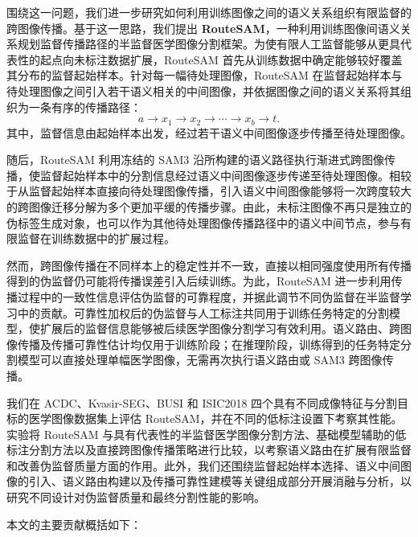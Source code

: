 \documentclass[UTF8,a4paper,10pt,twocolumn]{ctexart}
\begin{document}
围绕这一问题，我们进一步研究如何利用训练图像之间的语义关系组织有限监督的跨图像传播。基于这一思路，我们提出 \textbf{RouteSAM}，一种利用训练图像间语义关系规划监督传播路径的半监督医学图像分割框架。为使有限人工监督能够从更具代表性的起点向未标注数据扩展，RouteSAM 首先从训练数据中确定能够较好覆盖其分布的监督起始样本。针对每一幅待处理图像，RouteSAM 在监督起始样本与待处理图像之间引入若干语义相关的中间图像，并依据图像之间的语义关系将其组织为一条有序的传播路径：
\begin{equation}
a \rightarrow x_1 \rightarrow x_2 \rightarrow \cdots \rightarrow x_b \rightarrow t.
\end{equation}
其中，监督信息由起始样本出发，经过若干语义中间图像逐步传播至待处理图像。



随后，RouteSAM 利用冻结的 SAM3 沿所构建的语义路径执行渐进式跨图像传播，使监督起始样本中的分割信息经过语义中间图像逐步传递至待处理图像。相较于从监督起始样本直接向待处理图像传播，引入语义中间图像能够将一次跨度较大的跨图像迁移分解为多个更加平缓的传播步骤。由此，未标注图像不再只是独立的伪标签生成对象，也可以作为其他待处理图像传播路径中的语义中间节点，参与有限监督在训练数据中的扩展过程。

然而，跨图像传播在不同样本上的稳定性并不一致，直接以相同强度使用所有传播得到的伪监督仍可能将传播误差引入后续训练。为此，RouteSAM 进一步利用传播过程中的一致性信息评估伪监督的可靠程度，并据此调节不同伪监督在半监督学习中的贡献。可靠性加权后的伪监督与人工标注共同用于训练任务特定的分割模型，使扩展后的监督信息能够被后续医学图像分割学习有效利用。语义路由、跨图像传播及传播可靠性估计均仅用于训练阶段；在推理阶段，训练得到的任务特定分割模型可以直接处理单幅医学图像，无需再次执行语义路由或 SAM3 跨图像传播。

我们在 ACDC、Kvasir-SEG、BUSI 和 ISIC2018 四个具有不同成像特征与分割目标的医学图像数据集上评估 RouteSAM，并在不同的低标注设置下考察其性能。实验将 RouteSAM 与具有代表性的半监督医学图像分割方法、基础模型辅助的低标注分割方法以及直接跨图像传播策略进行比较，以考察语义路由在扩展有限监督和改善伪监督质量方面的作用。此外，我们还围绕监督起始样本选择、语义中间图像的引入、语义路由构建以及传播可靠性建模等关键组成部分开展消融与分析，以研究不同设计对伪监督质量和最终分割性能的影响。



本文的主要贡献概括如下：
\end{document}
